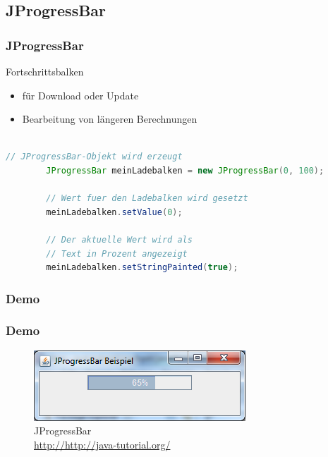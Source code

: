 \documentclass[xcolor=dvipsnames]{beamer}
\begin{document}
\subsection{JProgressBar}
\begin{frame}  %
  \frametitle{JProgressBar} %
  \begin{block}{Fortschrittsbalken}
	  \begin{itemize}
		\item für Download oder Update
		\item Bearbeitung von längeren Berechnungen
	  \end{itemize}
  \end{block}

\begin{lstlisting}[language=java,basicstyle=\scriptsize\ttfamily]

// JProgressBar-Objekt wird erzeugt
		JProgressBar meinLadebalken = new JProgressBar(0, 100);
 
		// Wert fuer den Ladebalken wird gesetzt
		meinLadebalken.setValue(0);
 
		// Der aktuelle Wert wird als 
		// Text in Prozent angezeigt
		meinLadebalken.setStringPainted(true);

\end{lstlisting}

\end{frame}

\subsubsection{Demo}
\begin{frame}
  \frametitle{Demo}
	\begin{figure}
		\includegraphics[scale=1.0]{images/jprogressbar.PNG}
		\caption{JProgressBar \\ \tiny{\textcolor{gray}{\url{http://http://java-tutorial.org/}}}}
		\end{figure}
\end{frame}
\end{document}
